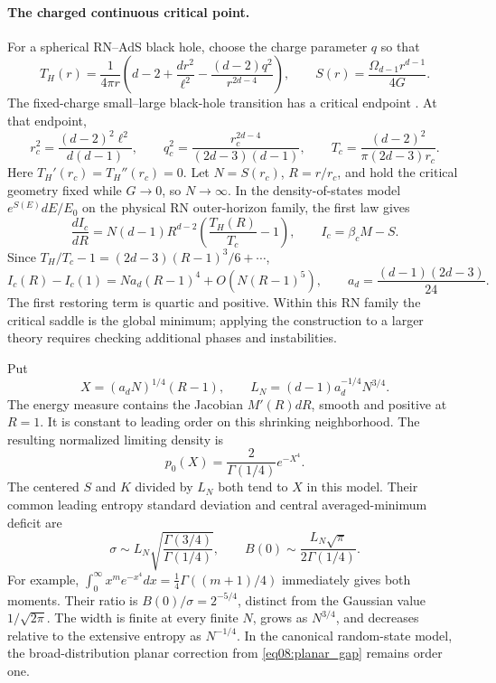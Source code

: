 \documentclass[11pt,letterpaper]{article}
\theoremstyle{plain}
\theoremstyle{definition}
\theoremstyle{remark}
\begin{document}
\paragraph{The charged continuous critical point.}
For a spherical RN--AdS black hole, choose the charge parameter $q$ so that
\begin{equation}
 T_H(r)=\frac{1}{4\pi r}
 \left(d-2+\frac{dr^2}{\ell^2}
       -\frac{(d-2)q^2}{r^{2d-4}}\right),
 \qquad S(r)=\frac{\Omega_{d-1}r^{d-1}}{4G}.
 \label{eq09:rn_temperature}
\end{equation}
The fixed-charge small--large black-hole transition has a critical endpoint
\citep{chamblin1999,kubiznakmann2012}. At that endpoint,
\begin{equation}
 r_c^2=\frac{(d-2)^2\ell^2}{d(d-1)},\qquad
 q_c^2=\frac{r_c^{2d-4}}{(2d-3)(d-1)},\qquad
 T_c=\frac{(d-2)^2}{\pi(2d-3)r_c}.
 \label{eq09:critical_geometry}
\end{equation}
Here $T_H'(r_c)=T_H''(r_c)=0$. Let $N=S(r_c)$, $R=r/r_c$, and hold the
critical geometry fixed while $G\to0$, so $N\to\infty$. In the density-of-states
model $e^{S(E)}dE/E_0$ on the physical RN outer-horizon family, the first law
gives
\begin{equation}
 \frac{dI_c}{dR}
 =N(d-1)R^{d-2}\left(\frac{T_H(R)}{T_c}-1\right),
 \qquad I_c=\beta_c M-S.
\end{equation}
Since $T_H/T_c-1=(2d-3)(R-1)^3/6+\cdots$,
\begin{equation}
 I_c(R)-I_c(1)=Na_d(R-1)^4+O(N(R-1)^5),
 \qquad a_d=\frac{(d-1)(2d-3)}{24}.
 \label{eq09:quartic_action}
\end{equation}
The first restoring term is quartic and positive. Within this RN family
the critical saddle is the global minimum; applying the construction to a
larger theory requires checking additional phases and instabilities.

Put
\begin{equation}
 X=(a_dN)^{1/4}(R-1),\qquad
 L_N=(d-1)a_d^{-1/4}N^{3/4}.
 \label{eq09:critical_scales}
\end{equation}
The energy measure contains the Jacobian $M'(R)dR$, smooth and positive at
$R=1$. It is constant to leading order on this shrinking neighborhood.
The resulting normalized limiting density is
\begin{equation}
 p_0(X)=\frac{2}{\Gamma(1/4)}e^{-X^4}.
 \label{eq09:quartic_density}
\end{equation}
The centered $S$ and $K$ divided by $L_N$ both tend to $X$ in this model.
Their common leading entropy standard deviation and central averaged-minimum
deficit are
\begin{equation}
 \sigma\sim L_N
 \sqrt{\frac{\Gamma(3/4)}{\Gamma(1/4)}},\qquad
 B(0)\sim\frac{L_N\sqrt{\pi}}{2\Gamma(1/4)}.
 \label{eq09:quartic_observables}
\end{equation}
For example,
$\int_0^\infty x^m e^{-x^4}dx=\tfrac14\Gamma((m+1)/4)$ immediately gives
both moments. Their ratio is $B(0)/\sigma=2^{-5/4}$, distinct from the
Gaussian value $1/\sqrt{2\pi}$. The width is finite at every finite $N$,
grows as $N^{3/4}$, and decreases relative to the extensive entropy as
$N^{-1/4}$. In the canonical random-state model, the broad-distribution
planar correction from \eqref{eq08:planar_gap} remains order one.
\end{document}
